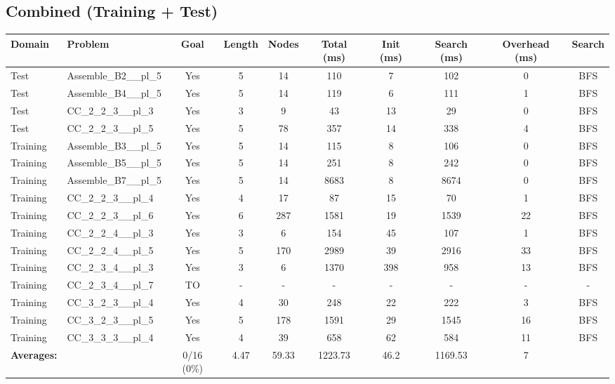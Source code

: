\documentclass{article}
\begin{document}
\subsection*{Combined (Training + Test)}
\begin{tabular}{llcccccccc}
\toprule
Domain & Problem & Goal & Length & Nodes & Total (ms) & Init (ms) & Search (ms) & Overhead (ms) & Search \\
\midrule
Test & Assemble\_B2\_\_pl\_5 & Yes & 5 & 14 & 110 & 7 & 102 & 0 & BFS \\
Test & Assemble\_B4\_\_pl\_5 & Yes & 5 & 14 & 119 & 6 & 111 & 1 & BFS \\
Test & CC\_2\_2\_3\_\_pl\_3 & Yes & 3 & 9 & 43 & 13 & 29 & 0 & BFS \\
Test & CC\_2\_2\_3\_\_pl\_5 & Yes & 5 & 78 & 357 & 14 & 338 & 4 & BFS \\
Training & Assemble\_B3\_\_pl\_5 & Yes & 5 & 14 & 115 & 8 & 106 & 0 & BFS \\
Training & Assemble\_B5\_\_pl\_5 & Yes & 5 & 14 & 251 & 8 & 242 & 0 & BFS \\
Training & Assemble\_B7\_\_pl\_5 & Yes & 5 & 14 & 8683 & 8 & 8674 & 0 & BFS \\
Training & CC\_2\_2\_3\_\_pl\_4 & Yes & 4 & 17 & 87 & 15 & 70 & 1 & BFS \\
Training & CC\_2\_2\_3\_\_pl\_6 & Yes & 6 & 287 & 1581 & 19 & 1539 & 22 & BFS \\
Training & CC\_2\_2\_4\_\_pl\_3 & Yes & 3 & 6 & 154 & 45 & 107 & 1 & BFS \\
Training & CC\_2\_2\_4\_\_pl\_5 & Yes & 5 & 170 & 2989 & 39 & 2916 & 33 & BFS \\
Training & CC\_2\_3\_4\_\_pl\_3 & Yes & 3 & 6 & 1370 & 398 & 958 & 13 & BFS \\
Training & CC\_2\_3\_4\_\_pl\_7 & TO & - & - & - & - & - & - & - \\
Training & CC\_3\_2\_3\_\_pl\_4 & Yes & 4 & 30 & 248 & 22 & 222 & 3 & BFS \\
Training & CC\_3\_2\_3\_\_pl\_5 & Yes & 5 & 178 & 1591 & 29 & 1545 & 16 & BFS \\
Training & CC\_3\_3\_3\_\_pl\_4 & Yes & 4 & 39 & 658 & 62 & 584 & 11 & BFS \\
\textbf{Averages:} & & 0/16 (0\%) & 4.47 & 59.33 & 1223.73 & 46.2 & 1169.53 & 7 & \\
\bottomrule
\end{tabular}
\newpage
\end{document}
